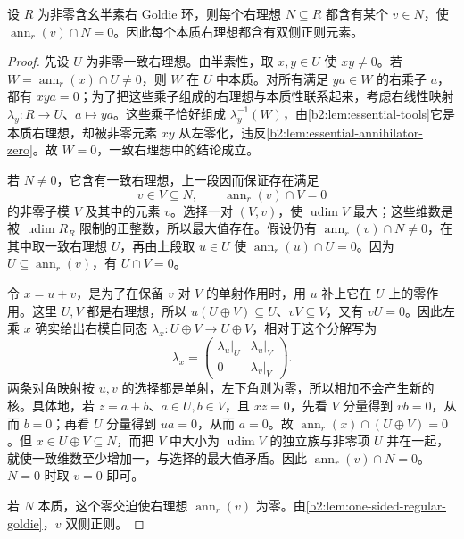 \begin{lemma}\label{b2:lem:goldie-ideal-regular-element}
	设 \(R\) 为非零含幺半素右 Goldie 环，则每个右理想 \(N\subseteq R\) 都含有某个 \(v\in N\)，使 \(\operatorname{ann}_r(v)\cap N=0\)。因此每个本质右理想都含有双侧正则元素。
\end{lemma}
\begin{proof}
	先设 \(U\) 为非零一致右理想。由半素性，取 \(x,y\in U\) 使 \(xy\ne0\)。若 \(W=\operatorname{ann}_r(x)\cap U\ne0\)，则 \(W\) 在 \(U\) 中本质。对所有满足 \(ya\in W\) 的右乘子 \(a\)，都有 \(xya=0\)；为了把这些乘子组成的右理想与本质性联系起来，考虑右线性映射 \(\lambda_y:R\rightarrow U\)、\(a\mapsto ya\)。这些乘子恰好组成 \(\lambda_y^{-1}(W)\)，由\cref{b2:lem:essential-tools}它是本质右理想，却被非零元素 \(xy\) 从左零化，违反\cref{b2:lem:essential-annihilator-zero}。故 \(W=0\)，一致右理想中的结论成立。

	若 \(N\ne0\)，它含有一致右理想，上一段因而保证存在满足
	\[
		v\in V\subseteq N,\qquad \operatorname{ann}_r(v)\cap V=0
	\]
	的非零子模 \(V\) 及其中的元素 \(v\)。选择一对 \((V,v)\)，使 \(\operatorname{udim}V\) 最大；这些维数是被 \(\operatorname{udim}R_R\) 限制的正整数，所以最大值存在。假设仍有 \(\operatorname{ann}_r(v)\cap N\ne0\)，在其中取一致右理想 \(U\)，再由上段取 \(u\in U\) 使 \(\operatorname{ann}_r(u)\cap U=0\)。因为 \(U\subseteq\operatorname{ann}_r(v)\)，有 \(U\cap V=0\)。

	令 \(x=u+v\)，是为了在保留 \(v\) 对 \(V\) 的单射作用时，用 \(u\) 补上它在 \(U\) 上的零作用。这里 \(U,V\) 都是右理想，所以 \(u(U\oplus V)\subseteq U\)、\(vV\subseteq V\)，又有 \(vU=0\)。因此左乘 \(x\) 确实给出右模自同态 \(\lambda_x:U\oplus V\rightarrow U\oplus V\)，相对于这个分解写为
	\[
		\lambda_x=
		\begin{pmatrix}
			\lambda_u|_U&\lambda_u|_V\\
			0&\lambda_v|_V
		\end{pmatrix}.
	\]
	两条对角映射按 \(u,v\) 的选择都是单射，左下角则为零，所以相加不会产生新的核。具体地，若 \(z=a+b\)、\(a\in U,b\in V\)，且 \(xz=0\)，先看 \(V\) 分量得到 \(vb=0\)，从而 \(b=0\)；再看 \(U\) 分量得到 \(ua=0\)，从而 \(a=0\)。故 \(\operatorname{ann}_r(x)\cap(U\oplus V)=0\)。但 \(x\in U\oplus V\subseteq N\)，而把 \(V\) 中大小为 \(\operatorname{udim}V\) 的独立族与非零项 \(U\) 并在一起，就使一致维数至少增加一，与选择的最大值矛盾。因此 \(\operatorname{ann}_r(v)\cap N=0\)。\(N=0\) 时取 \(v=0\) 即可。

	若 \(N\) 本质，这个零交迫使右理想 \(\operatorname{ann}_r(v)\) 为零。由\cref{b2:lem:one-sided-regular-goldie}，\(v\) 双侧正则。
\end{proof}

